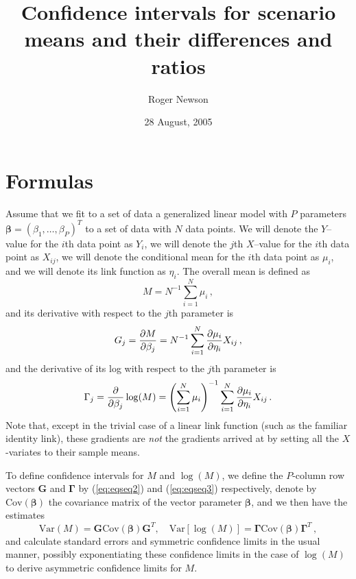 \documentclass{article}      %
\title{Confidence intervals for scenario means and their differences and ratios}  %
\author{Roger Newson}      %
\date{28 August, 2005}      %
\begin{document}

\maketitle                   %

\section{Formulas}

Assume that we fit to a set of data a generalized linear model with $P$ parameters $\mathbf{\beta}=(\beta_1, \ldots, \beta_P)^T$
to a set of data with $N$ data points. We will denote the $Y$--value for the $i$th data point as $Y_i$,
we will denote the $j$th $X$--value for the $i$th data point as $X_{ij}$,
we will denote the conditional mean for the $i$th data point as
$\mu_i$, and we will denote its link function as $\eta_i$. The overall mean is defined as
\begin{equation}
M=N^{-1} \sum_{i=1}^N \mu_i \, ,
\label{eq:eqseq1}
\end{equation}
and its derivative with respect to the $j$th parameter is
\begin{equation}
G_j = { {\partial M}\over{\partial \beta_j} } = N^{-1} \sum_{i=1}^N { {\partial \mu_i} \over {\partial \eta_i} } X_{ij} \, ,
\label{eq:eqseq2}
\end{equation}
and the derivative of its log with respect to the $j$th parameter is
\begin{equation}
\Gamma_j = { \partial \over {\partial \beta_j} } \log(M) = \left( \sum_{i=1}^N \mu_i \right)^{-1} \sum_{i=1}^N { {\partial \mu_i} \over {\partial \eta_i} } X_{ij} \, .
\label{eq:eqseq3}
\end{equation}
Note that, except in the trivial case of a linear link function (such as the familiar identity link),
these gradients are \textit{not} the gradients arrived at by setting all the $X$-variates to their sample means.

To define confidence intervals for $M$ and $\log(M)$,
we define the $P$-column row vectors $\mathbf{G}$ and $\mathbf{\Gamma}$ by (\ref{eq:eqseq2}) and (\ref{eq:eqseq3}) respectively,
\def\cov{\mathrm{Cov}}
\def\var{\mathrm{Var}}
denote by $\cov(\mathbf{\beta})$ the covariance matrix of the vector parameter $\mathbf{\beta}$,
and we then have the estimates
\begin{equation}
\var\left( M \right) = \mathbf{G} \cov(\mathbf{\beta}) {\mathbf{G}}^T,
 \quad \var\left[\log(M)\right] = \mathbf{\Gamma} \cov(\mathbf{\beta}) {\mathbf{\Gamma}}^T \, ,
\label{eq:eqseq4}
\end{equation}
and calculate standard errors and symmetric confidence limits in the usual manner,
possibly exponentiating these confidence limits in the case of $\log(M)$ to derive asymmetric confidence limits for $M$.
\end{document}
